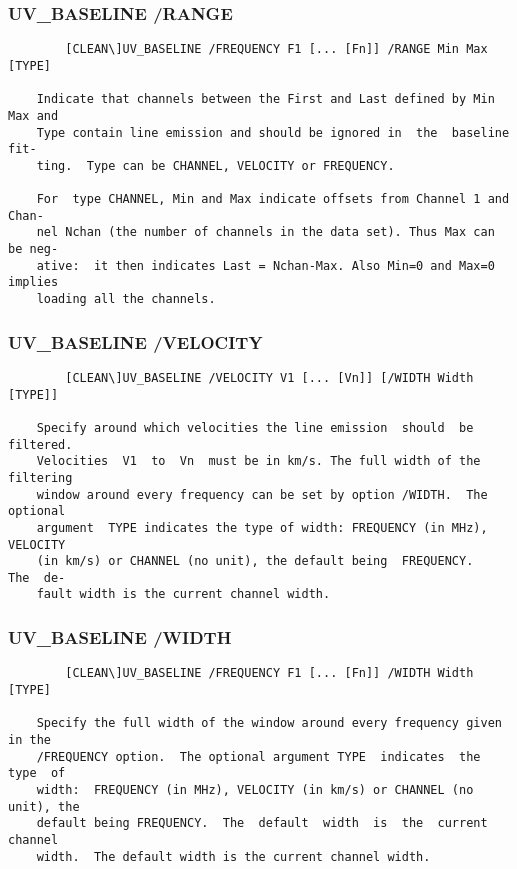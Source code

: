 \subsubsection{UV\_BASELINE /RANGE}
\begin{verbatim}
        [CLEAN\]UV_BASELINE /FREQUENCY F1 [... [Fn]] /RANGE Min Max [TYPE]

    Indicate that channels between the First and Last defined by Min Max and
    Type contain line emission and should be ignored in  the  baseline  fit-
    ting.  Type can be CHANNEL, VELOCITY or FREQUENCY.

    For  type CHANNEL, Min and Max indicate offsets from Channel 1 and Chan-
    nel Nchan (the number of channels in the data set). Thus Max can be neg-
    ative:  it then indicates Last = Nchan-Max. Also Min=0 and Max=0 implies
    loading all the channels.

\end{verbatim}
\subsubsection{UV\_BASELINE /VELOCITY}
\begin{verbatim}
        [CLEAN\]UV_BASELINE /VELOCITY V1 [... [Vn]] [/WIDTH Width [TYPE]]

    Specify around which velocities the line emission  should  be  filtered.
    Velocities  V1  to  Vn  must be in km/s. The full width of the filtering
    window around every frequency can be set by option /WIDTH.  The optional
    argument  TYPE indicates the type of width: FREQUENCY (in MHz), VELOCITY
    (in km/s) or CHANNEL (no unit), the default being  FREQUENCY.   The  de-
    fault width is the current channel width.

\end{verbatim}
\subsubsection{UV\_BASELINE /WIDTH}
\begin{verbatim}
        [CLEAN\]UV_BASELINE /FREQUENCY F1 [... [Fn]] /WIDTH Width [TYPE]

    Specify the full width of the window around every frequency given in the
    /FREQUENCY option.  The optional argument TYPE  indicates  the  type  of
    width:  FREQUENCY (in MHz), VELOCITY (in km/s) or CHANNEL (no unit), the
    default being FREQUENCY.  The  default  width  is  the  current  channel
    width.  The default width is the current channel width.

\end{verbatim}
